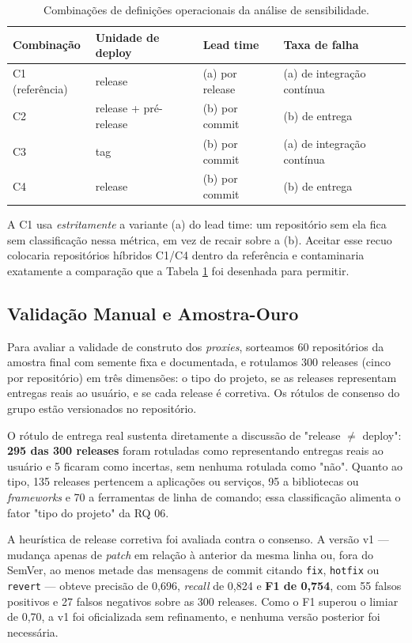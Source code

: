 \begin{table}[ht]
\centering
\caption{Combinações de definições operacionais da análise de sensibilidade.}
\label{tab:combinacoes}
\footnotesize
\begin{tabular}{llll}
\toprule
\textbf{Combinação} & \textbf{Unidade de deploy} & \textbf{Lead time} & \textbf{Taxa de falha} \\
\midrule
C1 (referência) & release & (a) por release & (a) de integração contínua \\
C2 & release + pré-release & (b) por commit & (b) de entrega \\
C3 & tag & (b) por commit & (a) de integração contínua \\
C4 & release & (b) por commit & (b) de entrega \\
\bottomrule
\end{tabular}
\end{table}

A C1 usa \emph{estritamente} a variante (a) do lead time: um repositório sem ela fica sem
classificação nessa métrica, em vez de recair sobre a (b). Aceitar esse recuo colocaria
repositórios híbridos C1/C4 dentro da referência e contaminaria exatamente a comparação que
a Tabela \ref{tab:combinacoes} foi desenhada para permitir.

\subsection{Validação Manual e Amostra-Ouro}

Para avaliar a validade de construto dos \emph{proxies}, sorteamos 60 repositórios da
amostra final com semente fixa e documentada, e rotulamos 300 releases (cinco por
repositório) em três dimensões: o tipo do projeto, se as releases representam entregas
reais ao usuário, e se cada release é corretiva. Os rótulos de consenso do grupo estão
versionados no repositório.

O rótulo de entrega real sustenta diretamente a discussão de "release $\neq$ deploy":
\textbf{295 das 300 releases} foram rotuladas como representando entregas reais ao usuário
e 5 ficaram como incertas, sem nenhuma rotulada como "não". Quanto ao tipo, 135 releases
pertencem a aplicações ou serviços, 95 a bibliotecas ou \emph{frameworks} e 70 a
ferramentas de linha de comando; essa classificação alimenta o fator "tipo do projeto" da
RQ 06.

A heurística de release corretiva foi avaliada contra o consenso. A versão v1 --- mudança
apenas de \emph{patch} em relação à anterior da mesma linha ou, fora do SemVer, ao menos
metade das mensagens de commit citando \texttt{fix}, \texttt{hotfix} ou \texttt{revert} ---
obteve precisão de 0,696, \emph{recall} de 0,824 e \textbf{F1 de 0,754}, com 55 falsos
positivos e 27 falsos negativos sobre as 300 releases. Como o F1 superou o limiar de 0,70,
a v1 foi oficializada sem refinamento, e nenhuma versão posterior foi necessária.

